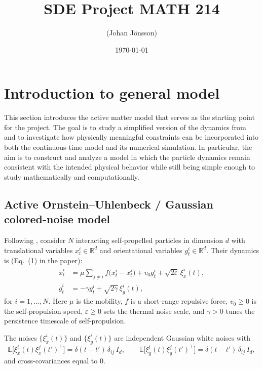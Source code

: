 \documentclass[11pt]{article}
\title{SDE Project MATH 214}
\author{(Johan Jönsson)}
\date{\today}
\newcommand{\R}{\mathbb{R}}
\newcommand{\E}{\mathbb{E}}
\newcommand{\1}{\mathbbm{1}}
\theoremstyle{plain}
\theoremstyle{definition}
\theoremstyle{remark}
\begin{document}
\maketitle

\tableofcontents
\newpage

\section{Introduction to general model}
This section introduces the active matter model that serves as the starting point for the project. The goal is to study a simplified version of the dynamics from \citet{boffi2024deep} and to investigate how physically meaningful constraints can be incorporated into both the continuous-time model and its numerical simulation. In particular, the aim is to construct and analyze a model in which the particle dynamics remain consistent with the intended physical behavior while still being simple enough to study mathematically and computationally.


\subsection{Active Ornstein--Uhlenbeck / Gaussian colored-noise model}
Following \citet{boffi2024deep}, consider $N$ interacting self-propelled particles in dimension $d$ with
translational variables $x_t^i \in \R^d$ and orientational variables $g_t^i \in \R^d$.
Their dynamics is (Eq.\ (1) in the paper):
\begin{align}
\dot{x}_t^i
&=
\mu\sum_{j\neq i} f\bigl(x_t^i - x_t^j\bigr) + v_0 g_t^i + \sqrt{2\varepsilon}\,\xi_x^i(t),
\label{eq:boffi-eq1-x}\\
\dot{g}_t^i
&=
-\gamma g_t^i + \sqrt{2\gamma}\,\xi_g^i(t),
\label{eq:boffi-eq1-g}
\end{align}
for $i=1,\dots,N$. Here $\mu$ is the mobility, $f$ is a short-range repulsive force,
$v_0\ge 0$ is the self-propulsion speed, $\varepsilon\ge 0$ sets the thermal noise scale,
and $\gamma>0$ tunes the persistence timescale of self-propulsion.

The noises $\{\xi_x^i(t)\}$ and $\{\xi_g^i(t)\}$ are independent Gaussian white noises with
\[
\E\bigl[\xi_x^i(t)\xi_x^j(t')^\top\bigr] = \delta(t-t')\,\delta_{ij}\,I_d,
\qquad
\E\bigl[\xi_g^i(t)\xi_g^j(t')^\top\bigr] = \delta(t-t')\,\delta_{ij}\,I_d,
\]
and cross-covariances equal to $0$.
\end{document}
